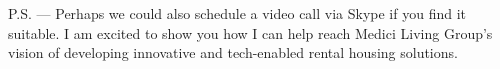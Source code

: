 \documentclass[11pt, a4paper]{awesome-cv}
\begin{document}
\makeletterclosing

P.S. — Perhaps we could also schedule a video call via Skype if you find it suitable. I am excited to show you how I can help reach Medici Living Group's vision of developing innovative and tech-enabled rental housing solutions.
\end{document}
